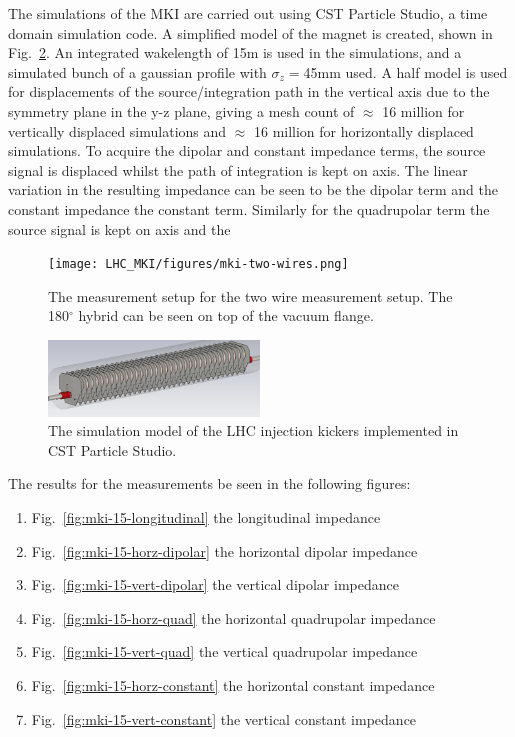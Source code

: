 The simulations of the MKI are carried out using CST Particle Studio, a time domain simulation code. A simplified model of the magnet is created, shown in Fig.~\ref{fig:mki-simulation-model}. An integrated wakelength of 15m is used in the simulations, and a simulated bunch of a gaussian profile with $\sigma_{z}=$45mm used. A half model is used for displacements of the source/integration path in the vertical axis due to the symmetry plane in the y-z plane, giving a mesh count of $\approx$ 16 million for vertically displaced simulations and $\approx$ 16 million for horizontally displaced simulations. To acquire the dipolar and constant impedance terms, the source signal is displaced whilst the path of integration is kept on axis. The linear variation in the resulting impedance can be seen to be the dipolar term and the constant impedance the constant term. Similarly for the quadrupolar term the source signal is kept on axis and the 



\begin{figure}
\begin{center}
\texttt{[image: LHC\_MKI/figures/mki-two-wires.png]}
\end{center}
\label{fig:mki-meas-two-wire}
\caption{The measurement setup for the two wire measurement setup. The 180$^{\circ}$ hybrid can be seen on top of the vacuum flange.}
\end{figure}

\begin{figure}
\begin{center}
\includegraphics[width=0.5\textwidth]{LHC_MKI/figures/simulation-model-mki-15.png}
\end{center}
\label{fig:mki-simulation-model}
\caption{The simulation model of the LHC injection kickers implemented in CST Particle Studio.}
\end{figure}


The results for the measurements be seen in the following figures:
\begin{enumerate}
\item{Fig.~\ref{fig:mki-15-longitudinal} the longitudinal impedance}
\item{Fig.~\ref{fig:mki-15-horz-dipolar} the horizontal dipolar impedance}
\item{Fig.~\ref{fig:mki-15-vert-dipolar} the vertical dipolar impedance}
\item{Fig.~\ref{fig:mki-15-horz-quad} the horizontal quadrupolar impedance}
\item{Fig.~\ref{fig:mki-15-vert-quad} the vertical quadrupolar impedance}
\item{Fig.~\ref{fig:mki-15-horz-constant} the horizontal constant impedance}
\item{Fig.~\ref{fig:mki-15-vert-constant} the vertical constant impedance}
\end{enumerate}

